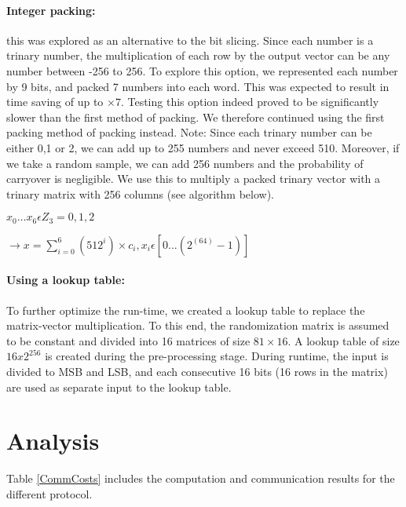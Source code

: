 \paragraph{Integer packing:} this was explored as an alternative to the bit slicing.  Since each number is a trinary number, the multiplication of each row by the output vector can be any number between -256 to 256. To explore this option, we represented each number by 9 bits, and packed 7 numbers into each word. This was expected to result in time saving of up to $\times 7$. Testing this option indeed proved to be significantly slower than the first method of packing. We therefore continued using the first packing method of packing instead.
Note: Since each trinary number can be either 0,1 or 2, we can add up to 255 numbers and never exceed 510. Moreover, if we take a random sample, we can add 256 numbers and the probability of carryover is negligible. We use this to multiply a packed trinary vector with a trinary matrix with 256 columns (see algorithm below).
	
	$x_0 \dots x_6 \epsilon Z_3 = {0,1,2}$
	
	$ \rightarrow x = \sum_{i=0}^{6} (512^i) \times c_i, x_i \epsilon [0 ... (2^(64)-1)]$



\paragraph{Using a lookup table:} To further optimize the run-time, we created a lookup table to replace the matrix-vector multiplication. To this end, the randomization matrix is assumed to be constant and divided into 16 matrices of size $81 \times 16$. A lookup table of size $16 x 2^{256}$ is created during the pre-processing stage. During runtime, the input is divided to MSB and LSB, and each consecutive 16 bits (16 rows in the matrix) are used as separate input to the lookup table.





\section{Analysis}

Table \ref{CommCosts} includes the computation and communication results for the different protocol.


